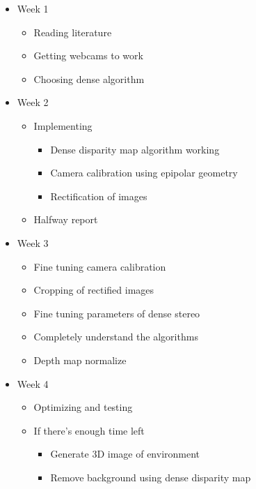 \documentclass[a4paper]{article}
\begin{document}
\begin{itemize}
  \item Week 1
    \begin{itemize}
      \item Reading literature
      \item Getting webcams to work
      \item Choosing dense algorithm
    \end{itemize}
  \item Week 2
    \begin{itemize}
      \item Implementing
        \begin{itemize}
          \item Dense disparity map algorithm working
          \item Camera calibration using epipolar geometry
          \item Rectification of images
        \end{itemize}
      \item Halfway report
    \end{itemize}
    
  \item Week 3
    \begin{itemize}
    \item Fine tuning camera calibration
    \item Cropping of rectified images
    \item Fine tuning parameters of dense stereo
    \item Completely understand the algorithms
    \item Depth map normalize
    \end{itemize}

  \item Week 4
    \begin{itemize}
      \item Optimizing and testing
      \item If there's enough time left
        \begin{itemize}
          \item Generate 3D image of environment
          \item Remove background using dense disparity map
        \end{itemize}
    \end{itemize}
\end{itemize}

 
\end{document}
